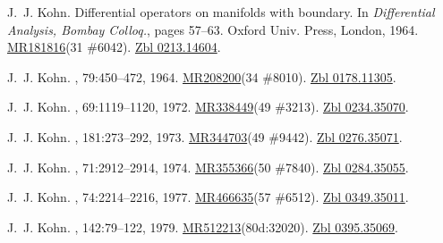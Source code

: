 \documentclass[11pt,a4paper, final, twoside]{article}
\numberwithin{equation}{section}
\begin{document}
\begin{appendices}
\begin{thebibliography}{100}
J.~J. Kohn.
\newblock Differential operators on manifolds with boundary.
\newblock In {\em Differential {A}nalysis, {B}ombay {C}olloq.}, pages 57--63.
  Oxford Univ. Press, London, 1964.
\newblock \href{http://www.ams.org/mathscinet-getitem?mr=181816}{MR181816}(31
  \#6042). \href{http://zbmath.org/?q=an:0213.14604}{Zbl 0213.14604}.

J.~J. Kohn.
, 79:450--472, 1964.
\newblock \href{http://www.ams.org/mathscinet-getitem?mr=208200}{MR208200}(34
  \#8010). \href{http://zbmath.org/?q=an:0178.11305}{Zbl 0178.11305}.

J.~J. Kohn.
, 69:1119--1120, 1972.
\newblock \href{http://www.ams.org/mathscinet-getitem?mr=338449}{MR338449}(49
  \#3213). \href{http://zbmath.org/?q=an:0234.35070}{Zbl 0234.35070}.

J.~J. Kohn.
,
  181:273--292, 1973.
\newblock \href{http://www.ams.org/mathscinet-getitem?mr=344703}{MR344703}(49
  \#9442). \href{http://zbmath.org/?q=an:0276.35071}{Zbl 0276.35071}.

J.~J. Kohn.
, 71:2912--2914, 1974.
\newblock \href{http://www.ams.org/mathscinet-getitem?mr=355366}{MR355366}(50
  \#7840). \href{http://zbmath.org/?q=an:0284.35055}{Zbl 0284.35055}.

J.~J. Kohn.
, 74:2214--2216, 1977.
\newblock \href{http://www.ams.org/mathscinet-getitem?mr=466635}{MR466635}(57
  \#6512). \href{http://zbmath.org/?q=an:0349.35011}{Zbl 0349.35011}.

J.~J. Kohn.
, 142:79--122, 1979.
\newblock
  \href{http://www.ams.org/mathscinet-getitem?mr=512213}{MR512213}(80d:32020).
  \href{http://zbmath.org/?q=an:0395.35069}{Zbl 0395.35069}.


\end{thebibliography}
\end{appendices}
\end{document}
